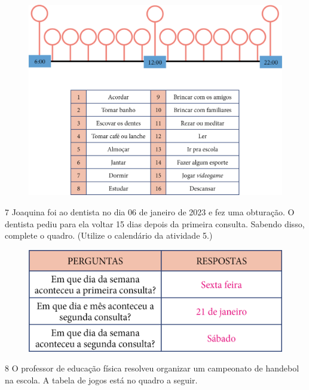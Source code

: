 \begin{figure}[H]
\centering
\includegraphics[width=\textwidth]{./media/image51.png}
\end{figure}


\pagebreak

\num{7} Joaquina foi ao dentista no dia 06 de janeiro de 2023 e fez uma
obturação. O dentista pediu para ela voltar 15 dias depois da primeira
consulta. Sabendo disso, complete o quadro. (Utilize o calendário
da atividade 5.)

\begin{figure}[htpb!]
\includegraphics[width=\textwidth]{./media/image53.png}
\end{figure}

\num{8} O professor de educação física resolveu organizar um campeonato de
handebol na escola. A tabela de jogos está no quadro a seguir.

